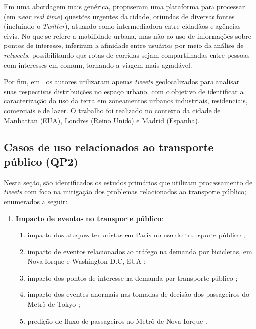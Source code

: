 \documentclass[
	12pt,				%
	oneside,			%
	a4paper,			%
	english,			%
	brazil				%
	]{abntex2ppgsi}
\begin{document}
{{{Em uma abordagem mais genérica, \cite{Mukherjee2015} propuseram uma plataforma para processar (em \textit{near real time}) questões urgentes da cidade, oriundas de diversas fontes (incluindo o \textit{Twitter}), atuando como intermediadora entre cidadãos e agências civis. No que se refere a mobilidade urbana, mas não ao uso de informações sobre pontos de interesse, \cite{Yousaf2014} inferiram a afinidade entre usuários por meio da análise de \textit{retweets}, possibilitando que rotas de corridas sejam compartilhadas entre pessoas com interesses em comum, tornando a viagem mais agradável.

Por fim, em \cite{Frias-Martinez2014}, os autores utilizaram apenas \textit{tweets} geolocalizados para analisar suas respectivas distribuições no espaço urbano, com o objetivo de identificar a caracterização do uso da terra em zoneamentos urbanos industriais, residenciais, comerciais e de lazer. O trabalho foi realizado no contexto da cidade de Manhattan (EUA), Londres (Reino Unido) e Madrid (Espanha).

\subsection{Casos de uso relacionados ao transporte público (QP2)}
Nesta seção, são identificados os estudos primários que utilizam processamento de \textit{tweets} com foco na mitigação dos problemas relacionados ao transporte público; enumerados a seguir:
\begin{enumerate}
\item \textbf{Impacto de eventos no transporte público}:
\begin{enumerate}
\item impacto dos ataques terroristas em Paris no uso do transporte público \cite{Wen2016};
\item impacto de eventos relacionados ao tráfego na demanda por bicicletas, em Nova Iorque e Washington D.C, EUA \cite{Chen2016};
\item impacto dos pontos de interesse na demanda por transporte público \cite{Maghrebi2015};
\item impacto dos eventos anormais nas tomadas de decisão dos passageiros do Metrô de Tokyo \cite{Itoh2016};
\item predição de fluxo de passageiros no Metrô de Nova Iorque \cite{Ni2016}.
\end{enumerate}


\end{enumerate}}}}
\end{document}
